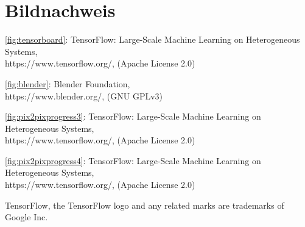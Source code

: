 \chapter*{Bildnachweis}

\autoref{fig:tensorboard}: {TensorFlow}: Large-Scale Machine Learning on Heterogeneous Systems,\\
https://www.tensorflow.org/, (Apache License 2.0)

\noindent
\autoref{fig:blender}: Blender Foundation,\\
https://www.blender.org/, (GNU GPLv3)

\noindent
\autoref{fig:pix2pixprogress3}: {TensorFlow}: Large-Scale Machine Learning on Heterogeneous Systems,\\
https://www.tensorflow.org/, (Apache License 2.0)

\noindent
\autoref{fig:pix2pixprogress4}: {TensorFlow}: Large-Scale Machine Learning on Heterogeneous Systems,\\
https://www.tensorflow.org/, (Apache License 2.0)

\noindent
TensorFlow, the TensorFlow logo and any related marks are trademarks of Google Inc.
